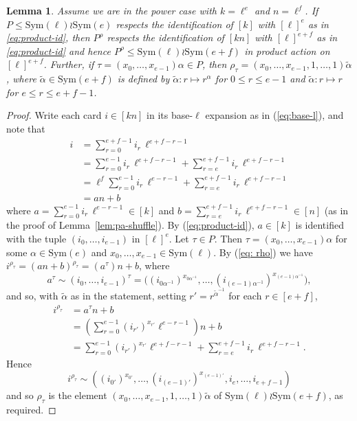 \documentclass[12pt]{amsart}
\newtheorem{lem}[thm]{Lemma}
\theoremstyle{remark}
\theoremstyle{definition}
\newcommand{\sym}{\mathrm{Sym}}
\begin{document}
\begin{lem} \label{lem:pa-P}
Assume we are in the power case with $k=\ell^e$ and $n=\ell^f$. If $P \leqslant \sym(\ell) \wr \sym(e)$ respects the identification of $[k]$ with $[\ell]^e$ as in \eqref{eq:product-id}, then $P^\rho$ respects the identification of $[kn]$ with $[\ell]^{e+f}$ as in \eqref{eq:product-id} and hence $P^\rho \leqslant \sym(\ell) \wr \sym(e+f)$ in product action on $[\ell]^{e+f}$. Further, if $\tau = (x_0,\dots,x_{e-1}) \alpha \in P$, then $\rho_\tau = (x_0,\dots,x_{e-1},1,\dots,1) \tilde{\alpha}$, where $\tilde{\alpha} \in \sym(e+f)$ is defined by $\tilde{\alpha}: r \mapsto r^\alpha$ for $0 \leqslant r \leqslant e-1$ and $\tilde{\alpha} : r \mapsto r$ for $e \leqslant r \leqslant e+f-1$.
\end{lem}

\begin{proof}
Write each card $i\in [kn]$ in its base-$\ell$ expansion as in (\ref{eq:base-l}), and note that
	\begin{align*}
	i
	&= \sum_{r=0}^{e+f-1} i_r\, \ell^{e+f-r-1} \\
	&= \sum_{r=0}^{e-1} i_r\, \ell^{e+f-r-1} + \sum_{r=e}^{e+f-1} i_r\, \ell^{e+f-r-1} \\
	&= \ell^f \sum_{r=0}^{e-1} i_r\, \ell^{e-r-1} + \sum_{r=e}^{e+f-1} i_r\, \ell^{e+f-r-1} \\
	&= an + b
	\end{align*}
where $a = \sum_{r=0}^{e-1} i_r\, \ell^{e-r-1} \in [k]$ and $b = \sum_{r=e}^{e+f-1} i_r\, \ell^{e+f-r-1} \in [n]$
(as in the proof of Lemma~\ref{lem:pa-shuffle}). By (\ref{eq:product-id}), $a \in[k]$ is identified with the tuple $(i_0, \ldots, i_{e-1})$ in $[\ell]^e$. Let $\tau \in P$. Then $\tau = (x_0, \ldots, x_{e-1}) \alpha$ for some $\alpha \in \sym(e)$ and $x_0, \ldots, x_{e-1} \in \sym(\ell)$. By (\ref{eq: rho}) we have $i ^{\rho_{\tau}} = (an+b)^{\rho_{\tau}} =  (a^\tau)n + b$, where
	\[ a^\tau \sim (i_0, \ldots, i_{e-1})^\tau = \big( (i_{0{\alpha^{-1}}})^{x_{0{\alpha^{-1}}}}, \ldots, (i_{(e-1){\alpha^{-1}}})^{x_{(e-1){\alpha^{-1}}}} \big), \]
and so, with $\tilde{\alpha}$ as in the statement, setting $r' = r^{\tilde{\alpha}^{-1}}$ for each $r \in [e+f]$,
	\begin{align*}
	i^{\rho_\tau}
	&=  a^\tau n + b \\
	&= \left( \sum_{r=0}^{e-1} (i_{r'})^{x_{r'}} \ell^{e-r-1} \right) n + b \\
	&= \sum_{r=0}^{e-1} (i_{r'})^{x_{r'}} \ell^{e+f-r-1} + \sum_{r=e}^{e+f-1} i_r\, \ell^{e+f-r-1}.
	\end{align*}
Hence 
	\[ i^{\rho_\tau} \sim ( (i_{0'})^{x_{0'}},\dots, (i_{(e-1)'})^{x_{(e-1)'}}, i_e, \dots, i_{e+f-1}) \]
and so $\rho_\tau$ is the element $(x_0, \ldots, x_{e-1}, 1, \ldots, 1) \tilde{\alpha}$ of $\sym(\ell) \wr \sym(e+f)$, as required.
\end{proof}
\end{document}
